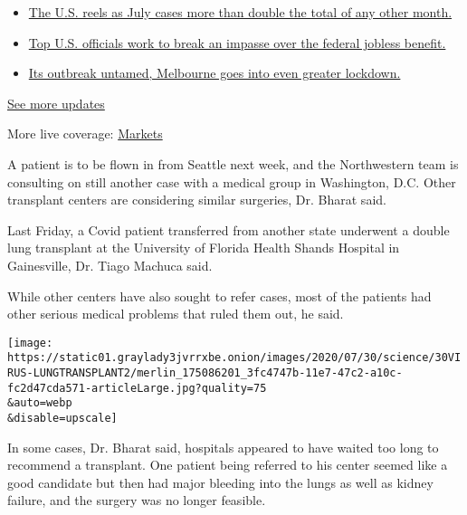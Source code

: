 \begin{itemize}
\tightlist
\item
  \href{https://www.nytimes3xbfgragh.onion/2020/08/01/world/coronavirus-covid-19.html?action=click\&pgtype=Article\&state=default\&region=MAIN_CONTENT_1\&context=storylines_live_updates\#link-34047410}{The
  U.S. reels as July cases more than double the total of any other
  month.}
\item
  \href{https://www.nytimes3xbfgragh.onion/2020/08/01/world/coronavirus-covid-19.html?action=click\&pgtype=Article\&state=default\&region=MAIN_CONTENT_1\&context=storylines_live_updates\#link-780ec966}{Top
  U.S. officials work to break an impasse over the federal jobless
  benefit.}
\item
  \href{https://www.nytimes3xbfgragh.onion/2020/08/01/world/coronavirus-covid-19.html?action=click\&pgtype=Article\&state=default\&region=MAIN_CONTENT_1\&context=storylines_live_updates\#link-2bc8948}{Its
  outbreak untamed, Melbourne goes into even greater lockdown.}
\end{itemize}

\href{https://www.nytimes3xbfgragh.onion/2020/08/01/world/coronavirus-covid-19.html?action=click\&pgtype=Article\&state=default\&region=MAIN_CONTENT_1\&context=storylines_live_updates}{See
more updates}

More live coverage:
\href{https://www.nytimes3xbfgragh.onion/live/2020/07/31/business/stock-market-today-coronavirus?action=click\&pgtype=Article\&state=default\&region=MAIN_CONTENT_1\&context=storylines_live_updates}{Markets}

A patient is to be flown in from Seattle next week, and the Northwestern
team is consulting on still another case with a medical group in
Washington, D.C. Other transplant centers are considering similar
surgeries, Dr. Bharat said.

Last Friday, a Covid patient transferred from another state underwent a
double lung transplant at the University of Florida Health Shands
Hospital in Gainesville, Dr. Tiago Machuca said.

While other centers have also sought to refer cases, most of the
patients had other serious medical problems that ruled them out, he
said.

\texttt{[image: https://static01.graylady3jvrrxbe.onion/images/2020/07/30/science/30VIRUS-LUNGTRANSPLANT2/merlin\_175086201\_3fc4747b-11e7-47c2-a10c-fc2d47cda571-articleLarge.jpg?quality=75\\\&auto=webp\\\&disable=upscale]}

In some cases, Dr. Bharat said, hospitals appeared to have waited too
long to recommend a transplant. One patient being referred to his center
seemed like a good candidate but then had major bleeding into the lungs
as well as kidney failure, and the surgery was no longer feasible.

